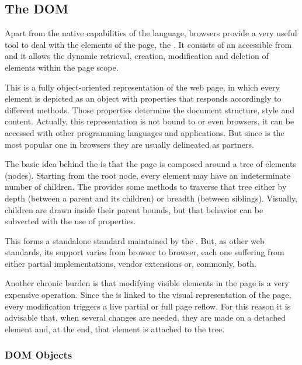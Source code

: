 \subsection{The DOM} %
\label{sub:dom}

Apart from the native capabilities of the  language, browsers provide a very useful tool to deal with the  elements of the page, the .
It consists of an  accessible from  and it allows the dynamic retrieval, creation, modification and deletion of  elements within the page scope.

This  is a fully object-oriented representation of the web page, in which every element is depicted as an object with properties that responds accordingly to different methods.
Those properties determine the document structure, style and content.
Actually, this representation is not bound to  or even browsers, it can be accessed with other programming languages and applications.
But since  is the most popular one in browsers they are usually delineated as partners.

The basic idea behind the  is that the page is composed around a tree of elements (nodes).
Starting from the root node, every element may have an indeterminate number of children.
The  provides some methods to traverse that tree either by depth (between a parent and its children) or breadth (between siblings).
Visually, children are drawn inside their parent bounds, but that behavior can be subverted with the use of  properties.

This  forms a standalone standard maintained by the .
But, as other web standards, its support varies from browser to browser, each one suffering from either partial implementations, vendor extensions or, commonly, both.

Another chronic burden is that modifying visible elements in the page is a very expensive operation.
Since the  is linked to the visual representation of the page, every modification triggers a live partial or full page reflow.
For this reason it is advisable that, when several  changes are needed, they are made on a detached element and, at the end, that element is attached to the  tree.

\subsubsection{DOM Objects} %
\label{ssub:domobjects}

